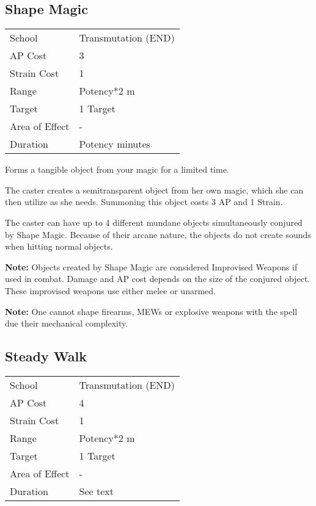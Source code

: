 \documentclass[11pt,a4paper,twocolumn]{book}
\begin{document}
\vfill

\subsection*{Shape Magic}

{
	\begin{tabu} to 75mm{| X[l,4] | X[l,7] |}
		\hline
		School 			& Transmutation (END) 	\\
		AP Cost	      	& 3 					\\
		Strain Cost     & 1 					\\
		Range     		& Potency*2	m			\\
		Target      	& 1 Target				\\
		Area of Effect  & -  	 				\\
		Duration     	& Potency minutes		\\ \hline
	\end{tabu}
	
}

\medskip

Forms a tangible object from your magic for a limited time.

The caster creates a semitransparent object from her own magic, which she can then utilize as she needs. Summoning this object costs 3 AP and 1 Strain.

The caster can have up to 4 different mundane objects simultaneously conjured by Shape Magic. Because of their arcane nature, the objects do not create sounds when hitting normal objects.

\textbf{Note:} Objects created by Shape Magic are considered Improvised Weapons if used in combat. Damage and AP cost depends on the size of the conjured object. These improvised weapons use either melee or unarmed.

\textbf{Note:} One cannot shape firearms, MEWs or explosive weapons with the spell due their mechanical complexity.

\vfill

\subsection*{Steady Walk}
{
	\begin{tabu} to 75mm{| X[l,4] | X[l,7] |}
		\hline
		School 			& Transmutation (END) 	\\
		AP Cost	      	& 4 					\\
		Strain Cost     & 1 					\\
		Range     		& Potency*2 m			\\
		Target      	& 1 Target				\\
		Area of Effect  & - 	 				\\
		Duration     	& See text	            \\ \hline
	\end{tabu}
	
}
\end{document}
